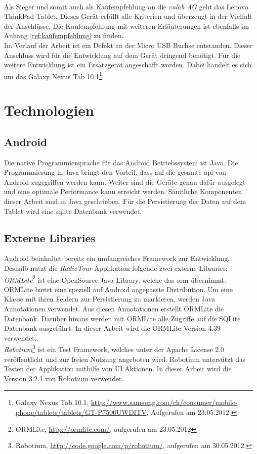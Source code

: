 \\
Als Sieger und somit auch als Kaufempfehlung an die \textit{cnlab AG} geht das Lenovo ThinkPad Tablet. Dieses Gerät erfüllt alle Kriterien und überzeugt in der Vielfalt der Anschlüsse. Die Kaufempfehlung mit weiteren Erläuterungen ist ebenfalls im Anhang \ref{ref:kaufempfehlung} zu finden.
\\
Im Verlauf der Arbeit ist ein Defekt an der Micro USB Buchse entstanden. Dieser Anschluss wird für die Entwicklung auf dem Gerät dringend benötigt. Für die weitere Entwicklung ist ein Ersatzgerät angeschafft worden. Dabei handelt es sich um das Galaxy Nexus Tab 10.1\footnote{Galaxy Nexus Tab 10.1, \url{http://www.samsung.com/ch/consumer/mobile-phone/tablets/tablets/GT-P7500UWDITV}, Aufgerufen am 23.05.2012.}

\section{Technologien}
\subsection{Android}
Die native Programmiersprache für das Android Betriebssystem ist Java. Die Programmierung in Java bringt den Vorteil, dass auf die gesamte \gls{api} von Android zugegriffen werden kann. Weiter sind die Geräte genau dafür ausgelegt und eine optimale Performance kann erreicht werden. Sämtliche Komponenten dieser Arbeit sind in Java geschrieben. Für die Persistierung der Daten auf dem Tablet wird eine \gls{sqlite} Datenbank verwendet.

\subsection{Externe Libraries}
Android beinhaltet bereits ein umfangreiches Framework zur Entwicklung. Deshalb nutzt die \textit{RadioTour} Applikation folgende zwei externe Libraries:
\\
\textit{ORMLite}\footnote{ORMLite, \url{http://ormlite.com/}, aufgerufen am 23.05.2012} ist eine OpenSource Java Library, welche das \gls{orm} übernimmt. ORMLite bietet eine speziell auf Android angepasste Distribution. Um eine Klasse mit ihren Feldern zur Persistierung zu markieren, werden Java Annotationen verwendet. Aus diesen Annotationen erstellt ORMLite die Datenbank. Darüber hinaus werden mit ORMLite alle Zugriffe auf die SQLite Datenbank ausgeführt. In dieser Arbeit wird die ORMLite Version 4.39 verwendet.
\\
\textit{Robotium}\footnote{Robotium, \url{http://code.google.com/p/robotium/}, aufgerufen am 30.05.2012.} ist ein Test Framework, welches unter der Apache License 2.0 veröffentlicht und zur freien Nutzung angeboten wird. Robotium untersützt das Testen der Applikation mithilfe von UI Aktionen. In dieser Arbeit wird die Version 3.2.1 von Robotium verwendet.


